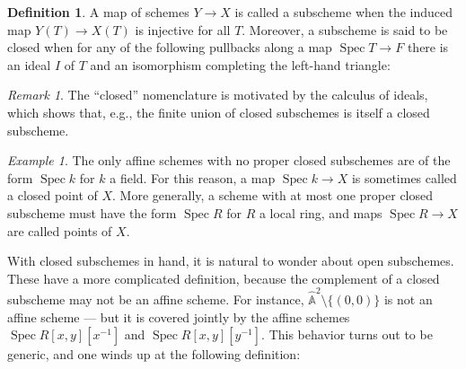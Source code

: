 \documentclass{amsart}
\newcommand{\A}{\widehat{\mathbb{A}}}
\newcommand{\<}{\langle}
\renewcommand{\>}{\rangle}
\DeclareMathOperator{\Spec}{Spec}
\theoremstyle{plain}
\theoremstyle{definition}
\newtheorem*{definition}{Definition}
\theoremstyle{remark}
\newtheorem*{remark}{Remark}
\newtheorem*{example}{Example}
\begin{document}
\begin{definition}\label{ClosedSubschemes}
A map of schemes $Y \to X$ is called a subscheme when the induced map $Y(T) \to X(T)$ is injective for all $T$.  Moreover, a subscheme is said to be closed when for any of the following pullbacks along a map $\Spec T \to F$ there is an ideal $I$ of $T$ and an isomorphism completing the left-hand triangle:
\begin{center}
\end{center}
\end{definition}

\begin{remark}
The ``closed'' nomenclature is motivated by the calculus of ideals, which shows that, e.g., the finite union of closed subschemes is itself a closed subscheme.
\end{remark}

\begin{example}
The only affine schemes with no proper closed subschemes are of the form $\Spec k$ for $k$ a field.  For this reason, a map $\Spec k \to X$ is sometimes called a closed point of $X$.  More generally, a scheme with at most one proper closed subscheme must have the form $\Spec R$ for $R$ a local ring, and maps $\Spec R \to X$ are called points of $X$.
\end{example}

With closed subschemes in hand, it is natural to wonder about open subschemes.  These have a more complicated definition, because the complement of a closed subscheme may not be an affine scheme.  For instance, $\A^2 \setminus \{(0, 0)\}$ is not an affine scheme --- but it is covered jointly by the affine schemes $\Spec R[x, y][x^{-1}]$ and $\Spec R[x, y][y^{-1}]$.  This behavior turns out to be generic, and one winds up at the following definition:
\end{document}
